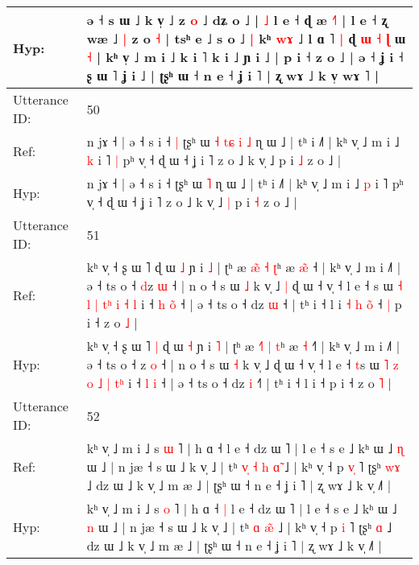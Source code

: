 \documentclass[10pt]{article}
\DeclareRobustCommand{\hl}[1]{{\textcolor{red}{#1}}}
\begin{document}
\begin{longtable}{ll}
 \\
Hyp: & ə ˧ s ɯ ˩ k v̩\hl{}\hl{}\hl{}\hl{}\hl{}\hl{} ˩ z \hl{o} ˩ dʑ o ˩ |\hl{ }\hl{˩} l e ˧ ɖ æ \hl{˧}˥ | l e ˧ ʐ wæ ˩\hl{ }\hl{|} z o \hl{˧} | tsʰ e ˩ s o ˩\hl{ }\hl{|} kʰ \hl{w}\hl{ɤ} ˩ l ɑ ˥\hl{ }\hl{|} ɖ\hl{ }\hl{ɯ}\hl{ }\hl{˧}\hl{ }\hl{ɭ} ɯ \hl{˧} | kʰ v̩ ˩ m i ˩ k i ˥ k i ˩ ɲ i ˩ | p i ˧ z o ˩ | ə ˧ ʝ i ˧ ʂ ɯ ˥ ʝ i ˩ | ʈʂʰ ɯ ˧ n e ˧ ʝ i ˥ | ʐ wɤ ˩ k v̩\hl{}\hl{} wɤ ˥ |
 \\
\midrule
Utterance ID: & 50 \\
Ref: & n jɤ ˧ | ə ˧ s i ˧\hl{ }\hl{|} ʈʂʰ ɯ\hl{ }\hl{˧}\hl{ }\hl{t}\hl{ɕ}\hl{ }\hl{i} \hl{˩} ɳ ɯ ˩ | tʰ i ˩˥ | kʰ v̩ ˩ m i ˩ \hl{k} i ˥\hl{ }\hl{|} pʰ v̩ ˧ ɖ ɯ ˧ ʝ i ˥ z o ˩ k v̩ ˩\hl{}\hl{} p i \hl{˩} z o ˩ |
 \\
Hyp: & n jɤ ˧ | ə ˧ s i ˧\hl{}\hl{} ʈʂʰ ɯ\hl{}\hl{}\hl{}\hl{}\hl{}\hl{}\hl{} \hl{˥} ɳ ɯ ˩ | tʰ i ˩˥ | kʰ v̩ ˩ m i ˩ \hl{p} i ˥\hl{}\hl{} pʰ v̩ ˧ ɖ ɯ ˧ ʝ i ˥ z o ˩ k v̩ ˩\hl{ }\hl{|} p i \hl{˧} z o ˩ |
 \\
\midrule
Utterance ID: & 51 \\
Ref: & kʰ v̩ ˧ ʂ ɯ ˥\hl{}\hl{} ɖ ɯ \hl{˩} ɲ i \hl{˩} | ʈʰ æ \hl{æ}\hl{̃} \hl{˧} \hl{ʈ}ʰ æ \hl{æ}\hl{̃} ˧\hl{} | kʰ v̩ ˩ m i ˩˥ | ə ˧ ts o ˧ \hl{d}z \hl{ɯ} ˧ | n o ˧ s ɯ \hl{˩} k v̩ ˩\hl{ }\hl{|} ɖ ɯ ˧ v̩ ˧ l e ˧ \hl{}s ɯ \hl{˧} \hl{l} \hl{|} \hl{t}\hl{ʰ} \hl{i} \hl{˧}\hl{ }\hl{l} i ˧ \hl{h} \hl{o}\hl{̃} ˧ | ə ˧ ts o ˧ dz \hl{ɯ} ˧\hl{} | tʰ i ˧ l i\hl{ }\hl{˧}\hl{ }\hl{h}\hl{ }\hl{o}\hl{̃} ˧\hl{ }\hl{|} p i ˧ z o \hl{˩} |
 \\
Hyp: & kʰ v̩ ˧ ʂ ɯ ˥\hl{ }\hl{|} ɖ ɯ \hl{˧} ɲ i \hl{˥} | ʈʰ æ \hl{˧}\hl{˥} \hl{|} \hl{t}ʰ æ \hl{}\hl{˧} ˧\hl{˥} | kʰ v̩ ˩ m i ˩˥ | ə ˧ ts o ˧ \hl{}z \hl{o} ˧ | n o ˧ s ɯ \hl{˧} k v̩ ˩\hl{}\hl{} ɖ ɯ ˧ v̩ ˧ l e ˧ \hl{t}s ɯ \hl{˥} \hl{z} \hl{o} \hl{}\hl{˩} \hl{|} \hl{}\hl{t}\hl{ʰ} i ˧ \hl{l} \hl{}\hl{i} ˧ | ə ˧ ts o ˧ dz \hl{i} ˧\hl{˥} | tʰ i ˧ l i\hl{}\hl{}\hl{}\hl{}\hl{}\hl{}\hl{} ˧\hl{}\hl{} p i ˧ z o \hl{˥} |
 \\
\midrule
Utterance ID: & 52 \\
Ref: & kʰ v̩ ˩ m i ˩ s \hl{ɯ} ˥ | h ɑ ˧\hl{}\hl{} l e ˧ dz ɯ ˥ | l e ˧ s e ˩ kʰ ɯ ˩ \hl{ɳ} ɯ ˩ | n jæ ˧ s ɯ ˩ k v̩ ˩ | tʰ\hl{ }\hl{v}\hl{̩}\hl{ }\hl{˧} \hl{h} \hl{ɑ}̃ ˩ | kʰ v̩ ˧ p \hl{v}\hl{̩} ˥ ʈʂʰ \hl{w}\hl{ɤ} ˩ dz ɯ ˩ k v̩ ˩ m æ ˩ | ʈʂʰ ɯ ˧ n e ˧ ʝ i ˥ | ʐ wɤ ˩ k v̩ ˩˥ |
 \\
Hyp: & kʰ v̩ ˩ m i ˩ s \hl{o} ˥ | h ɑ ˧\hl{ }\hl{|} l e ˧ dz ɯ ˥ | l e ˧ s e ˩ kʰ ɯ ˩ \hl{n} ɯ ˩ | n jæ ˧ s ɯ ˩ k v̩ ˩ | tʰ\hl{}\hl{}\hl{}\hl{}\hl{} \hl{ɑ} \hl{æ}̃ ˩ | kʰ v̩ ˧ p \hl{}\hl{i} ˥ ʈʂʰ \hl{}\hl{ɑ} ˩ dz ɯ ˩ k v̩ ˩ m æ ˩ | ʈʂʰ ɯ ˧ n e ˧ ʝ i ˥ | ʐ wɤ ˩ k v̩ ˩˥ |

\end{longtable}
\end{document}
